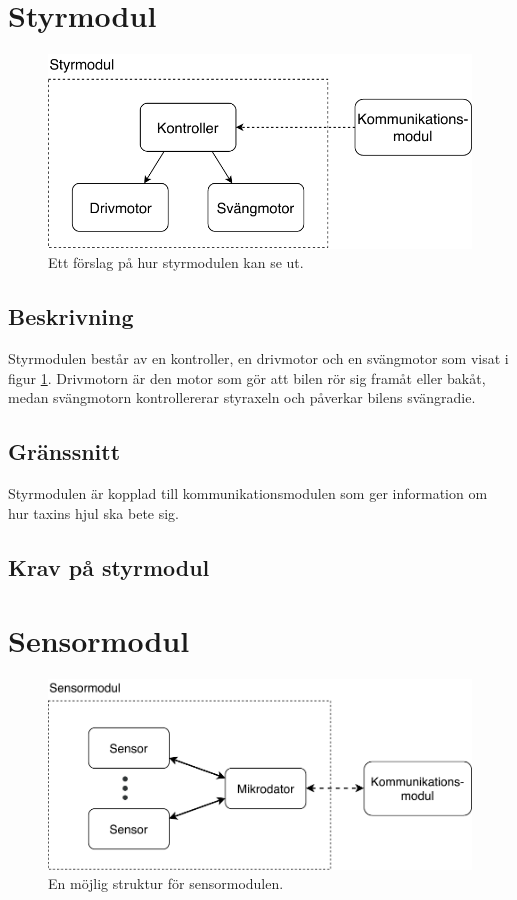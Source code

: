 \documentclass[kravspec/krav.tex]{subfiles}
\begin{document}
\section{Styrmodul}
\begin{figure}[h]
    \centering
    \includegraphics[width=0.6\linewidth]{kravspec/figures/styrmodul.pdf}
    \caption{Ett förslag på hur styrmodulen kan se ut.}
    \label{fig:styrmodul}
\end{figure}

\subsection{Beskrivning}
Styrmodulen består av en kontroller, en drivmotor och en svängmotor som visat i
figur \ref{fig:styrmodul}. Drivmotorn är den motor som gör att bilen rör sig
framåt eller bakåt, medan svängmotorn kontrollererar styraxeln och påverkar
bilens svängradie.

\subsection{Gränssnitt}
Styrmodulen är kopplad till kommunikationsmodulen som ger information om hur
taxins hjul ska bete sig.

\subsection{Krav på styrmodul}
\begin{reqlist}
\end{reqlist}

\clearpage
\section{Sensormodul}
\begin{figure}[h]
    \centering
    \includegraphics[width=0.6\linewidth]{kravspec/figures/sensormodul.pdf}
    \caption{En möjlig struktur för sensormodulen.}
    \label{fig:sensormodul}
\end{figure}
\end{document}
